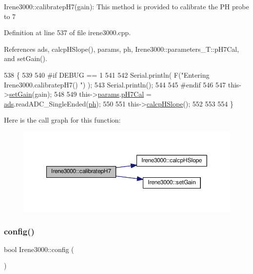 Irene3000\+::calibratep\+H7(gain)\+: This method is provided to calibrate the PH probe to 7 

Definition at line 537 of file irene3000.\+cpp.



References ads, calcp\+H\+Slope(), params, ph, Irene3000\+::parameters\+\_\+\+T\+::p\+H7\+Cal, and set\+Gain().


\begin{DoxyCode}
538 \{
539 
540 \textcolor{preprocessor}{#if DEBUG == 1 }
541 
542     Serial.println( F(\textcolor{stringliteral}{"Entering Irene3000.calibratepH7() "}) );
543     Serial.println();
544 
545 \textcolor{preprocessor}{#endif }
546 
547     this->\hyperlink{classIrene3000_aff7c5da186b388e7272e63ff88a20c34}{setGain}(gain);
548         
549     this->\hyperlink{classIrene3000_a136585a5ee7f9ac6ab52175fa153f8e3}{params}.\hyperlink{structIrene3000_1_1parameters__T_a21265466a570d84bff914f26d2f7a03e}{pH7Cal} = \hyperlink{classIrene3000_a1215e77ba761c9908d80d691f149e135}{ads}.readADC\_SingleEnded(\hyperlink{Irene3000_8h_af771ceafe0e6524dd8497d4305dfe778}{ph});
550  
551     this->\hyperlink{classIrene3000_a81f6a79e546679692053f7ac1af49613}{calcpHSlope}();
552 
553 
554 \}
\end{DoxyCode}
Here is the call graph for this function\+:
\nopagebreak
\begin{figure}[H]
\begin{center}
\leavevmode
\includegraphics[width=350pt]{classIrene3000_a2e810ddfa8b95eaa2446a408761c6bdc_cgraph}
\end{center}
\end{figure}
\mbox{\label{classIrene3000_afed5c35e4b23963c157847ef27c11e9c}} 
\subsubsection{\texorpdfstring{config()}{config()}}
{\footnotesize\ttfamily bool Irene3000\+::config (\begin{DoxyParamCaption}{ }\end{DoxyParamCaption})}

